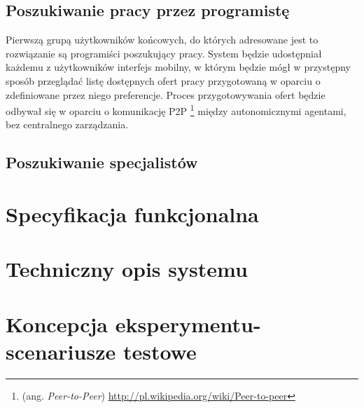 \documentclass[11pt,a4paper]{article}
\begin{document}
\subsection{Poszukiwanie pracy przez programistę}
Pierwszą grupą użytkowników końcowych, do których adresowane jest to rozwiązanie są programiści poszukujący pracy. 
System będzie udostępniał każdemu z użytkowników interfejs mobilny,  w którym będzie mógł w przystępny sposób przeglądać listę dostępnych ofert pracy przygotowaną w oparciu o zdefiniowane przez niego preferencje. 
Proces przygotowywania ofert będzie odbywał się w oparciu o komunikację P2P \footnote{(ang. \emph{Peer-to-Peer}) \url{http://pl.wikipedia.org/wiki/Peer-to-peer}} między autonomicznymi agentami, bez centralnego zarządzania.
\subsection{Poszukiwanie specjalistów}


\section{Specyfikacja funkcjonalna}


\section{Techniczny opis systemu}


\section{Koncepcja eksperymentu- scenariusze testowe}
	
\end{document}
